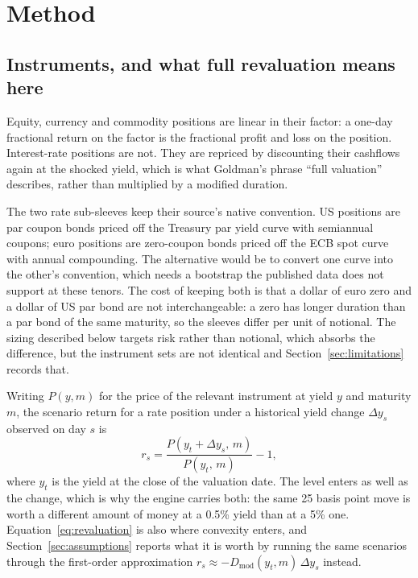 %

\section{Method}\label{sec:method}

\subsection{Instruments, and what full revaluation means here}

Equity, currency and commodity positions are linear in their factor: a one-day
fractional return on the factor is the fractional profit and loss on the
position. Interest-rate positions are not. They are repriced by discounting
their cashflows again at the shocked yield, which is what Goldman's phrase
``full valuation'' describes, rather than multiplied by a modified duration.

The two rate sub-sleeves keep their source's native convention. US positions
are par coupon bonds priced off the Treasury par yield curve with semiannual
coupons; euro positions are zero-coupon bonds priced off the ECB spot curve
with annual compounding. The alternative would be to convert one curve into the
other's convention, which needs a bootstrap the published data does not
support at these tenors. The cost of keeping both is that a dollar of euro zero
and a dollar of US par bond are not interchangeable: a zero has longer duration
than a par bond of the same maturity, so the sleeves differ per unit of
notional. The sizing described below targets risk rather than notional, which
absorbs the difference, but the instrument sets are not identical and
Section~\ref{sec:limitations} records that.

Writing $P(y, m)$ for the price of the relevant instrument at yield $y$ and
maturity $m$, the scenario return for a rate position under a historical yield
change $\Delta y_{s}$ observed on day $s$ is
\begin{equation}
r_{s} = \frac{P(y_{t} + \Delta y_{s},\, m)}{P(y_{t},\, m)} - 1 ,
\label{eq:revaluation}
\end{equation}
where $y_{t}$ is the yield at the close of the valuation date. The level enters
as well as the change, which is why the engine carries both: the same 25 basis
point move is worth a different amount of money at a 0.5\% yield than at a 5\%
one. Equation~\eqref{eq:revaluation} is also where convexity enters, and
Section~\ref{sec:assumptions} reports what it is worth by running the same
scenarios through the first-order approximation
$r_{s} \approx -D_{\mathrm{mod}}(y_{t}, m)\,\Delta y_{s}$ instead.

